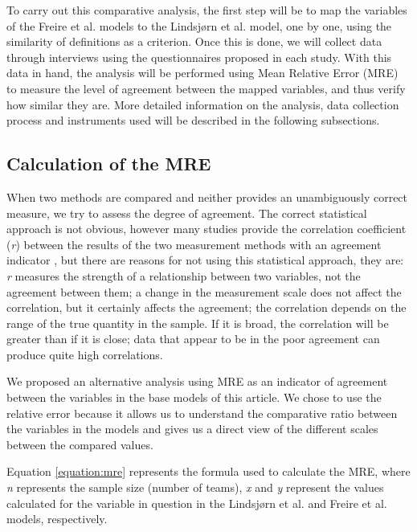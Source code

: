 To carry out this comparative analysis, the first step will be to map the variables of the Freire et al. \cite{freire2018bayesian} models to the Lindsjørn et al. \cite{lindsjorn2016teamwork} model, one by one, using the similarity of definitions as a criterion. Once this is done, we will collect data through interviews using the questionnaires proposed in each study. With this data in hand, the analysis will be performed using Mean Relative Error (MRE) to measure the level of agreement between the mapped variables, and thus verify how similar they are. More detailed information on the analysis, data collection process and instruments used will be described in the following subsections.

\subsection{Calculation of the MRE}
\label{mre}

When two methods are compared and neither provides an unambiguously correct measure, we try to assess the degree of agreement. The correct statistical approach is not obvious, however many studies provide the correlation coefficient (\textit{r}) between the results of the two measurement methods with an agreement indicator \cite{altman1983measurement}, but there are reasons for not using this statistical approach, they are: \textit{r} measures the strength of a relationship between two variables, not the agreement between them; a change in the measurement scale does not affect the correlation, but it certainly affects the agreement; the correlation depends on the range of the true quantity in the sample. If it is broad, the correlation will be greater than if it is close; data that appear to be in the poor agreement can produce quite high correlations.

We proposed an alternative analysis using MRE as an indicator of agreement between the variables in the base models of this article. We chose to use the relative error because it allows us to understand the comparative ratio between the variables in the models and gives us a direct view of the different scales between the compared values. 

Equation \ref{equation:mre} represents the formula used to calculate the MRE, where \textit{n} represents the sample size (number of teams), \textit{x} and \textit{y} represent the values calculated for the variable in question in the Lindsjørn et al. \cite{lindsjorn2016teamwork} and Freire et al. \cite{freire2018bayesian} models, respectively.

